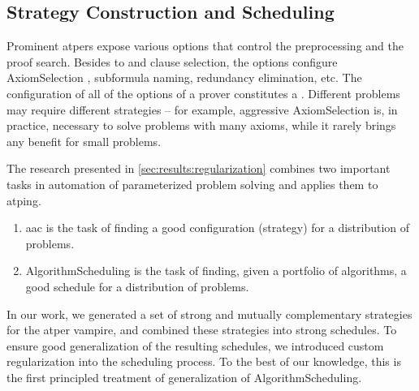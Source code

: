 
\subsection{Strategy Construction and Scheduling}

Prominent \glspl{atper} expose various options that control the preprocessing and the proof search.
Besides \gls{to} and clause selection,
the options configure \gls{AxiomSelection} \cite{DBLP:conf/cade/HoderV11}, subformula naming, redundancy elimination, etc.
The configuration of all of the options of a prover constitutes a .
Different problems may require different strategies -- for example, aggressive \gls{AxiomSelection} is, in practice, necessary to solve problems with many axioms, while it rarely brings any benefit for small problems.

The research presented in \cref{sec:results:regularization} combines two important tasks in automation of parameterized problem solving and applies them to \gls{atping}.
\begin{enumerate}
\item \Gls{aac} is the task of finding a good configuration (strategy) for a distribution of problems.
\item \Gls{AlgorithmScheduling} is the task of finding, given a portfolio of algorithms, a good schedule for a distribution of problems.
\end{enumerate}
In our work, we generated a set of strong and mutually complementary strategies for the \gls{atper} \gls{vampire},
and combined these strategies into strong schedules.
To ensure good generalization of the resulting schedules, we introduced custom regularization into the scheduling process.
To the best of our knowledge, this is the first principled treatment of generalization of \gls{AlgorithmScheduling}.

